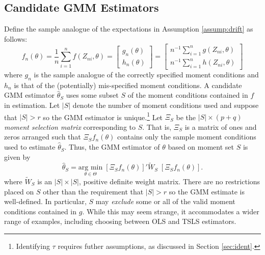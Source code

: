 \subsection{Candidate GMM Estimators}
Define the sample analogue of the expectations in Assumption \ref{assump:drift} as follows:
$$f_n(\theta) = \frac{1}{n}\sum_{i=1}^n f(Z_{ni},\theta) = \left[\begin{array}{c} g_n(\theta)\\ h_n(\theta) \end{array} \right]=\left[\begin{array}{c}n^{-1}\sum_{i=1}^n g(Z_{ni},\theta) \\ n^{-1}\sum_{i=1}^n h(Z_{ni},\theta) \end{array}\right]$$
where $g_n$ is the sample analogue of the correctly specified moment conditions and $h_n$ is that of the (potentially) mis-specified moment conditions.
A candidate GMM estimator $\widehat{\theta}_S$ uses some subset $S$ of the moment conditions contained in $f$ in estimation. 
Let $|S|$ denote the number of moment conditions used and suppose that $|S|>r$ so the GMM estimator is unique.\footnote{Identifying $\tau$ requires futher assumptions, as discussed in Section \ref{sec:ident}.} 
Let $\Xi_S$ be the $|S| \times(p +q)$ \emph{moment selection matrix} corresponding to $S$. That is, $\Xi_S$ is a matrix of ones and zeros arranged such that $\Xi_S f_n(\theta)$ contains only the sample moment conditions used to estimate $\widehat{\theta}_S$. 
Thus, the GMM estimator of $\theta$ based on moment set $S$ is given by 
$$\widehat{\theta}_S = \underset{\theta \in \Theta}{\mbox{arg min}}\; \left[\Xi_S f_n(\theta)\right]' \widetilde{W}_S \; \left[ \Xi_S f_n(\theta)\right].$$
where $\widetilde{W}_S$ is an $|S|\times |S|$, positive definite weight matrix.
There are no restrictions placed on $S$ other than the requirement that $|S| >r$ so the GMM estimate is well-defined. 
In particular, $S$ may \emph{exclude} some or all of the valid moment conditions contained in $g$.
While this may seem strange, it accommodates a wider range of examples, including choosing between OLS and TSLS estimators.

